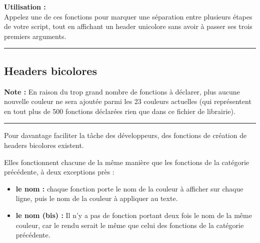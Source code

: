 \documentclass[a4paper,10pt]{article}
\begin{document}
\begin{justify}
    \textbf{Utilisation :}\\
    Appelez une de ces fonctions pour marquer une séparation entre plusieurs étapes de votre script, tout en affichant un header unicolore sans avoir à passer ses trois premiers arguments.
\end{justify}




\color{green}\par\noindent\rule{\textwidth}{0.4pt}\color{white}

\color{green}
\subsection{Headers bicolores}\color{white}

\begin{justify}
    \textbf{Note :} En raison du trop grand nombre de fonctions à déclarer, plus aucune nouvelle couleur ne sera ajoutée parmi les 23 couleurs actuelles (qui représentent en tout plus de 500 fonctions déclarées rien que dans ce fichier de librairie).
\end{justify}

\par\noindent\rule{\textwidth}{0.4pt}

\begin{justify}
    Pour davantage faciliter la tâche des développeurs, des fonctions de création de headers bicolores existent.
\end{justify}

\begin{justify}
    Elles fonctionnent chacune de la même manière que les fonctions de la catégorie précédente, à deux exceptions près :

    \begin{itemize}
        \item \textbf{le nom :} chaque fonction porte le nom de la couleur à afficher sur chaque ligne, puis le nom de la couleur à appliquer au texte.\\

        \item \textbf{le nom (bis) :} Il n'y a pas de fonction portant deux fois le nom de la même couleur, car le rendu serait le même que celui des fonctions de la catégorie précédente.
    \end{itemize}
\end{justify}
\end{document}
